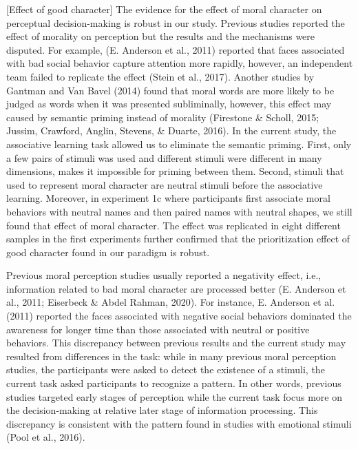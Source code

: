 \documentclass[
  man]{apa6}
\begin{document}
{[}Effect of good character{]} The evidence for the effect of moral character on perceptual decision-making is robust in our study. Previous studies reported the effect of morality on perception but the results and the mechanisms were disputed. For example, (E. Anderson et al., 2011) reported that faces associated with bad social behavior capture attention more rapidly, however, an independent team failed to replicate the effect (Stein et al., 2017). Another studies by Gantman and Van Bavel (2014) found that moral words are more likely to be judged as words when it was presented subliminally, however, this effect may caused by semantic priming instead of morality (Firestone \& Scholl, 2015; Jussim, Crawford, Anglin, Stevens, \& Duarte, 2016). In the current study, the associative learning task allowed us to eliminate the semantic priming. First, only a few pairs of stimuli was used and different stimuli were different in many dimensions, makes it impossible for priming between them. Second, stimuli that used to represent moral character are neutral stimuli before the associative learning. Moreover, in experiment 1c where participants first associate moral behaviors with neutral names and then paired names with neutral shapes, we still found that effect of moral character. The effect was replicated in eight different samples in the first experiments further confirmed that the prioritization effect of good character found in our paradigm is robust.

Previous moral perception studies usually reported a negativity effect, i.e., information related to bad moral character are processed better (E. Anderson et al., 2011; Eiserbeck \& Abdel Rahman, 2020). For instance, E. Anderson et al. (2011) reported the faces associated with negative social behaviors dominated the awareness for longer time than those associated with neutral or positive behaviors. This discrepancy between previous results and the current study may resulted from differences in the task: while in many previous moral perception studies, the participants were asked to detect the existence of a stimuli, the current task asked participants to recognize a pattern. In other words, previous studies targeted early stages of perception while the current task focus more on the decision-making at relative later stage of information processing. This discrepancy is consistent with the pattern found in studies with emotional stimuli (Pool et al., 2016).
\end{document}
